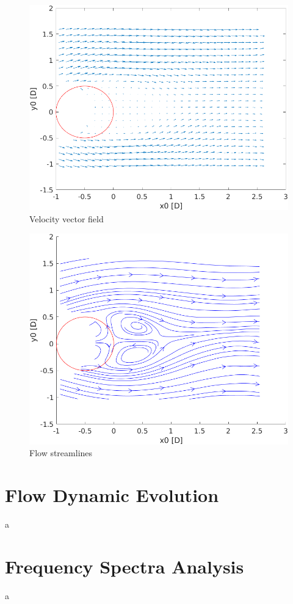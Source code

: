 \documentclass[12pt]{article}
\begin{document}
        \begin{figure}[ht!]
                \centering
                \includegraphics[width=\textwidth]{Vector_Field.png}
                \caption{Velocity vector field}
                \label{fig:vf}
        \end{figure}

        \begin{figure}[ht!]
                \centering
                \includegraphics[width=\textwidth]{Streamlines.png}
                \caption{Flow streamlines}
                \label{fig:streamlines}
        \end{figure}

\section{Flow Dynamic Evolution} \label{sec:dynamics}

        a

\section{Frequency Spectra Analysis} \label{sec:spectra}

        a



\end{document}
